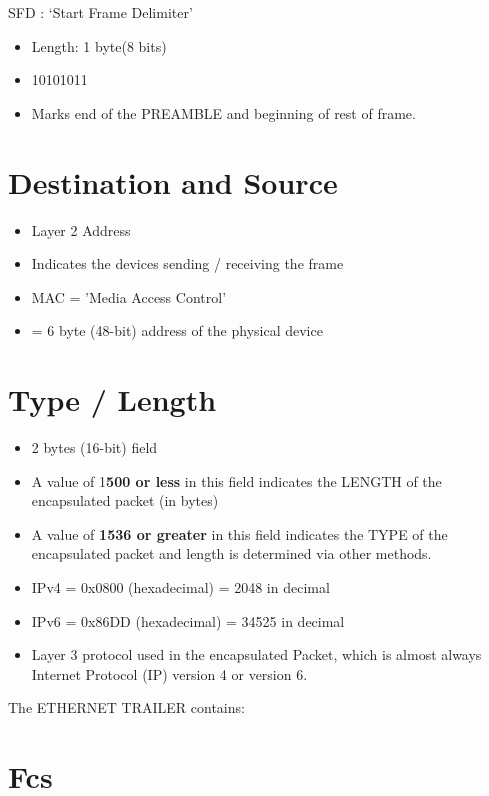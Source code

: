 SFD : `Start Frame Delimiter'

\begin{itemize}
\tightlist
\item
  Length: 1 byte(8 bits)
\item
  10101011
\item
  Marks end of the PREAMBLE and beginning of rest of frame.
\end{itemize}

\section{Destination and Source}\label{destination-and-source}

\begin{itemize}
\tightlist
\item
  Layer 2 Address
\item
  Indicates the devices sending / receiving the frame
\item
  MAC = 'Media Access Control'
\item
  = 6 byte (48-bit) address of the physical device
\end{itemize}

\section{Type / Length}\label{type-length}

\begin{itemize}
\tightlist
\item
  2 bytes (16-bit) field
\item
  A value of 1\textbf{500 or less} in this field indicates the LENGTH of
  the encapsulated packet (in bytes)
\item
  A value of \textbf{1536 or greater} in this field indicates the TYPE
  of the encapsulated packet and length is determined via other methods.
\item
  IPv4 = 0x0800 (hexadecimal) = 2048 in decimal
\item
  IPv6 = 0x86DD (hexadecimal) = 34525 in decimal
\item
  Layer 3 protocol used in the encapsulated Packet, which is almost
  always Internet Protocol (IP) version 4 or version 6.
\end{itemize}

The ETHERNET TRAILER contains:

\section{Fcs}\label{fcs}

